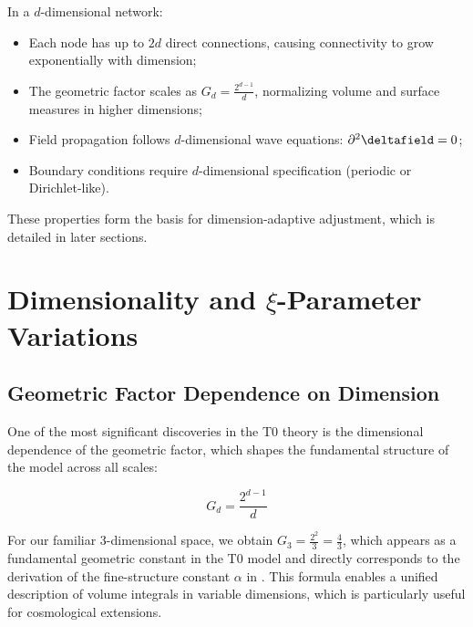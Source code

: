 	\begin{tcolorbox}[colback=blue!5!white,colframe=blue!75!black,title=Dimensional Network Properties,breakable]
		In a $d$-dimensional network:
		\begin{itemize}
			\item Each node has up to $2d$ direct connections, causing connectivity to grow exponentially with dimension;
			\item The geometric factor scales as $G_d = \frac{2^{d-1}}{d}$, normalizing volume and surface measures in higher dimensions;
			\item Field propagation follows $d$-dimensional wave equations: $\partial^2 \deltafield = 0$;
			\item Boundary conditions require $d$-dimensional specification (periodic or Dirichlet-like).
		\end{itemize}
	\end{tcolorbox}
	
	These properties form the basis for dimension-adaptive adjustment, which is detailed in later sections.
	
	\section{Dimensionality and $\xi$-Parameter Variations}
	\label{sec:dimensionality_xi}
	
	\subsection{Geometric Factor Dependence on Dimension}
	\label{subsec:geometric_factor}
	
	One of the most significant discoveries in the T0 theory is the dimensional dependence of the geometric factor, which shapes the fundamental structure of the model across all scales:
	
	\begin{equation}
		G_d = \frac{2^{d-1}}{d}
	\end{equation}
	
	For our familiar 3-dimensional space, we obtain $G_3 = \frac{2^2}{3} = \frac{4}{3}$, which appears as a fundamental geometric constant in the T0 model and directly corresponds to the derivation of the fine-structure constant $\alpha$ in \cite{T0_Feinstruktur}. This formula enables a unified description of volume integrals in variable dimensions, which is particularly useful for cosmological extensions.
	
